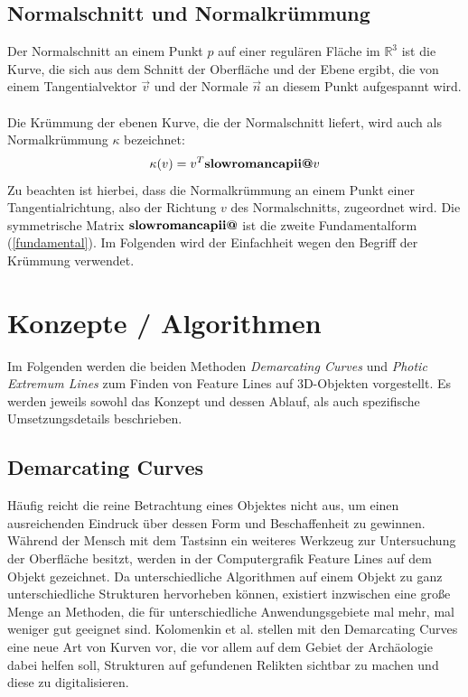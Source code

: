 \documentclass{paperStyle}
\makeatletter
\newcommand{\Rmnum}[1]{\textbf{\expandafter\@slowromancap\romannumeral #1@}}
\makeatother
\begin{document}
\subsection{Normalschnitt und Normalkrümmung}
\label{normalschnitt}
Der Normalschnitt an einem Punkt $p$ auf einer regulären Fläche im $\mathbb{R}^3$ ist die Kurve, die sich aus dem Schnitt der Oberfläche und der Ebene ergibt, die von einem Tangentialvektor $\vec{v}$ und der Normale $\vec{n}$ an diesem Punkt aufgespannt wird.\\\\Die Krümmung der ebenen Kurve, die der Normalschnitt liefert, wird auch als Normalkrümmung $\kappa$ bezeichnet:
\begin{equation}
	\kappa(v)= v^T\Rmnum{2}v
\end{equation}
Zu beachten ist hierbei, dass die Normalkrümmung an einem Punkt einer Tangentialrichtung, also der Richtung $v$ des Normalschnitts, zugeordnet wird. Die symmetrische Matrix $\Rmnum{2}$ ist die zweite Fundamentalform (\ref{fundamental}). Im Folgenden wird der Einfachheit wegen den Begriff der Krümmung verwendet. 


\section{Konzepte / Algorithmen}
Im Folgenden werden die beiden Methoden \textit{Demarcating Curves}\cite{Demarcating} und \textit{Photic Extremum Lines} \cite{Xie2007} zum Finden von Feature Lines auf 3D-Objekten vorgestellt. Es werden jeweils sowohl das Konzept und dessen Ablauf, als auch spezifische Umsetzungsdetails beschrieben.

\subsection{Demarcating Curves}\label{demcurvlabel}
Häufig reicht die reine Betrachtung eines Objektes nicht aus, um einen ausreichenden Eindruck über dessen Form und Beschaffenheit zu gewinnen. Während der Mensch mit dem Tastsinn ein weiteres Werkzeug zur Untersuchung der Oberfläche besitzt, werden in der Computergrafik Feature Lines auf dem Objekt gezeichnet. Da unterschiedliche Algorithmen auf einem Objekt zu ganz unterschiedliche Strukturen hervorheben können, existiert inzwischen eine große Menge an Methoden, die für unterschiedliche Anwendungsgebiete mal mehr, mal weniger gut geeignet sind. Kolomenkin et al. \cite{Demarcating} stellen mit den Demarcating Curves eine neue Art von Kurven vor, die vor allem auf dem Gebiet der Archäologie dabei helfen soll, Strukturen auf gefundenen Relikten sichtbar zu machen und diese zu digitalisieren.
\end{document}
